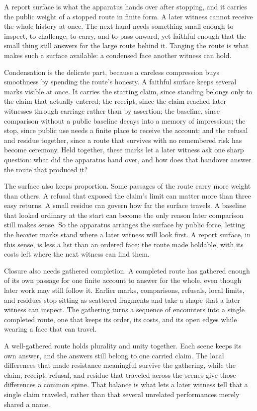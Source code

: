 A report surface is what the apparatus hands over after stopping, and it carries
the public weight of a stopped route in finite form. A later witness cannot
receive the whole history at once. The next hand needs something small enough to
inspect, to challenge, to carry, and to pass onward, yet faithful enough that
the small thing still answers for the large route behind it. Tanging the route
is what makes such a surface available: a condensed face another witness can
hold.

Condensation is the delicate part, because a careless compression buys
smoothness by spending the route's honesty. A faithful surface keeps several
marks visible at once. It carries the starting claim, since standing belongs
only to the claim that actually entered; the receipt, since the claim reached
later witnesses through carriage rather than by assertion; the baseline, since
comparison without a public baseline decays into a memory of impressions; the
stop, since public use needs a finite place to receive the account; and the
refusal and residue together, since a route that survives with no remembered
risk has become ceremony. Held together, these marks let a later witness ask one
sharp question: what did the apparatus hand over, and how does that handover
answer the route that produced it?

The surface also keeps proportion. Some passages of the route carry more weight
than others. A refusal that exposed the claim's limit can matter more than three
easy returns. A small residue can govern how far the surface travels. A baseline
that looked ordinary at the start can become the only reason later comparison
still makes sense. So the apparatus arranges the surface by public force,
letting the heavier marks stand where a later witness will look first. A report
surface, in this sense, is less a list than an ordered face: the route made
holdable, with its costs left where the next witness can find them.

Closure also needs gathered completion. A completed route has gathered enough of
its own passage for one finite account to answer for the whole, even though
later work may still follow it. Earlier marks, comparisons, refusals, local
limits, and residues stop sitting as scattered fragments and take a shape that a
later witness can inspect. The gathering turns a sequence of encounters into a
single completed route, one that keeps its order, its costs, and its open edges
while wearing a face that can travel.

A well-gathered route holds plurality and unity together. Each scene keeps its
own answer, and the answers still belong to one carried claim. The local
differences that made resistance meaningful survive the gathering, while the
claim, receipt, refusal, and residue that traveled across the scenes give those
differences a common spine. That balance is what lets a later witness tell that
a single claim traveled, rather than that several unrelated performances merely
shared a name.

